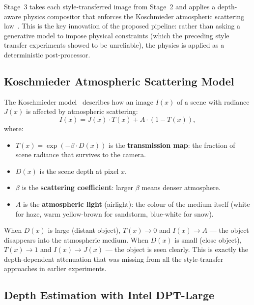 \noindent Stage~3 takes each style-transferred image from Stage~2 and applies a depth-aware physics compositor that enforces the Koschmieder atmospheric scattering law~\cite{koschmieder1924theorie}. This is the key innovation of the proposed pipeline: rather than asking a generative model to impose physical constraints (which the preceding style transfer experiments showed to be unreliable), the physics is applied as a deterministic post-processor.

\FloatBarrier
\subsection{Koschmieder Atmospheric Scattering Model}
\label{sec:koschmieder}

\noindent The Koschmieder model~\cite{koschmieder1924theorie} describes how an image $I(x)$ of a scene with radiance $J(x)$ is affected by atmospheric scattering:
\begin{equation}
    I(x) = J(x) \cdot T(x) + A \cdot (1 - T(x)),
    \label{eq:koschmieder}
\end{equation}
where:
\begin{itemize}
    \item $T(x) = \exp(-\beta \cdot D(x))$ is the \textbf{transmission map}: the fraction of scene radiance that survives to the camera.
    \item $D(x)$ is the scene depth at pixel $x$.
    \item $\beta$ is the \textbf{scattering coefficient}: larger $\beta$ means denser atmosphere.
    \item $A$ is the \textbf{atmospheric light} (airlight): the colour of the medium itself (white for haze, warm yellow-brown for sandstorm, blue-white for snow).
\end{itemize}

\noindent When $D(x)$ is large (distant object), $T(x) \rightarrow 0$ and $I(x) \rightarrow A$ — the object disappears into the atmospheric medium. When $D(x)$ is small (close object), $T(x) \rightarrow 1$ and $I(x) \rightarrow J(x)$ — the object is seen clearly. This is exactly the depth-dependent attenuation that was missing from all the style-transfer approaches in earlier experiments.

\FloatBarrier
\subsection{Depth Estimation with Intel DPT-Large}
\label{sec:dpt_depth}

